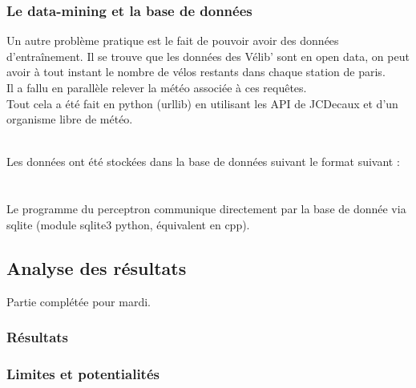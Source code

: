 \documentclass[a4paper, 11pt]{article}
\begin{document}
	\subsubsection{Le data-mining et la base de données}

Un autre problème pratique est le fait de pouvoir avoir des données d'entraînement.
Il se trouve que les données des Vélib' sont en open data, on peut avoir à tout instant le nombre de vélos restants dans chaque station de paris.
\\Il a fallu en parallèle relever la météo associée à ces requêtes.
\\Tout cela a été fait en python (urllib) en utilisant les API de JCDecaux et d'un organisme libre de météo.

\\Les données ont été stockées dans la base de données suivant le format suivant :
\\
\\
\\

Le programme du perceptron communique directement par la base de donnée via sqlite (module sqlite3 python, équivalent en cpp).

\subsection{Analyse des résultats}
Partie complétée pour mardi.
	\subsubsection{Résultats}
	\subsubsection{Limites et potentialités}

 
\end{document}
